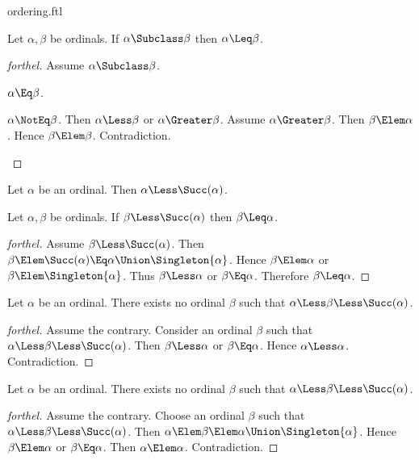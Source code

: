 \documentclass{stex}
\begin{document}
\begin{smodule}{ordering.ftl}
\begin{proposition*}[forthel]
  Let $\alpha, \beta$ be ordinals.
  If $\alpha \Subclass \beta$ then $\alpha \Leq \beta$.
\end{proposition*}
\begin{proof}[forthel]
  Assume $\alpha \Subclass \beta$.

  \begin{case}{$\alpha \Eq \beta$.} \end{case}

  \begin{case}{$\alpha \NotEq \beta$.}
    Then $\alpha \Less \beta$ or $\alpha \Greater \beta$.
    Assume $\alpha \Greater \beta$.
    Then $\beta \Elem \alpha$.
    Hence $\beta \Elem \beta$.
    Contradiction.
  \end{case}
\end{proof}

\begin{proposition*}[forthel]
  Let $\alpha$ be an ordinal.
  Then $\alpha \Less \Succ(\alpha)$.
\end{proposition*}

\begin{proposition*}[forthel]
  Let $\alpha, \beta$ be ordinals.
  If $\beta \Less \Succ(\alpha)$ then $\beta \Leq \alpha$.
\end{proposition*}
\begin{proof}[forthel]
  Assume $\beta \Less \Succ(\alpha)$.
  Then $\beta \Elem \Succ(\alpha) \Eq \alpha \Union \Singleton{\alpha}$.
  Hence $\beta \Elem \alpha$ or $\beta \Elem \Singleton{\alpha}$.
  Thus $\beta \Less \alpha$ or $\beta \Eq \alpha$.
  Therefore $\beta \Leq \alpha$.
\end{proof}

\begin{proposition*}[forthel]
  Let $\alpha$ be an ordinal.
  There exists no ordinal $\beta$ such that $\alpha \Less \beta \Less \Succ(\alpha)$.
\end{proposition*}
\begin{proof}[forthel]
  Assume the contrary.
  Consider an ordinal $\beta$ such that $\alpha \Less \beta \Less \Succ(\alpha)$.
  Then $\beta \Less \alpha$ or $\beta \Eq \alpha$.
  Hence $\alpha \Less \alpha$.
  Contradiction.
\end{proof}

\begin{proposition*}[forthel]
  Let $\alpha$ be an ordinal.
  There exists no ordinal $\beta$ such that $\alpha \Less \beta \Less \Succ(\alpha)$.
\end{proposition*}
\begin{proof}[forthel]
  Assume the contrary.
  Choose an ordinal $\beta$ such that $\alpha \Less \beta \Less \Succ(\alpha)$.
  Then $\alpha \Elem \beta \Elem \alpha \Union \Singleton{\alpha}$.
  Hence $\beta \Elem \alpha$ or $\beta \Eq \alpha$.
  Then $\alpha \Elem \alpha$.
  Contradiction.
\end{proof}


\end{smodule}
\end{document}
